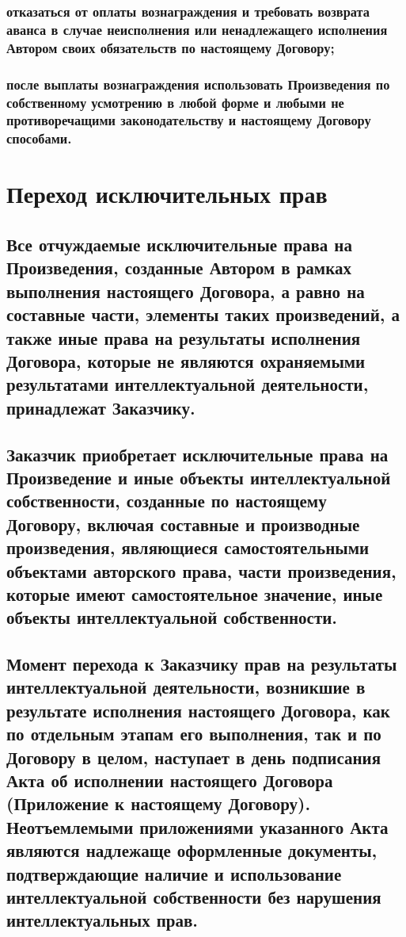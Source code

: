 \documentclass[12pt]{article}
\begin{document}
\subsubsection{отказаться от оплаты вознаграждения и требовать возврата аванса в случае неисполнения или ненадлежащего исполнения Автором своих обязательств по настоящему Договору;}

\subsubsection{после выплаты вознаграждения использовать Произведения по собственному усмотрению в любой форме и любыми не противоречащими законодательству и настоящему Договору способами.}

\newpage
\section{Переход исключительных прав}

\subsection{Все отчуждаемые исключительные права на Произведения, созданные Автором в рамках выполнения настоящего Договора, а равно на составные части, элементы таких произведений, а также иные права на результаты исполнения Договора, которые не являются охраняемыми результатами интеллектуальной деятельности, принадлежат Заказчику.}

\subsection{Заказчик приобретает исключительные права на Произведение и иные объекты интеллектуальной собственности, созданные по настоящему Договору, включая составные и производные произведения, являющиеся самостоятельными объектами авторского права, части произведения, которые имеют самостоятельное значение, иные объекты интеллектуальной собственности.}

\subsection{Момент перехода к Заказчику прав на результаты интеллектуальной деятельности, возникшие в результате исполнения настоящего Договора, как по отдельным этапам его выполнения, так и по Договору в целом, наступает в день подписания Акта об исполнении настоящего Договора (Приложение  к настоящему Договору). Неотъемлемыми приложениями указанного Акта являются надлежаще оформленные документы, подтверждающие наличие и использование интеллектуальной собственности без нарушения интеллектуальных прав.}
\end{document}
